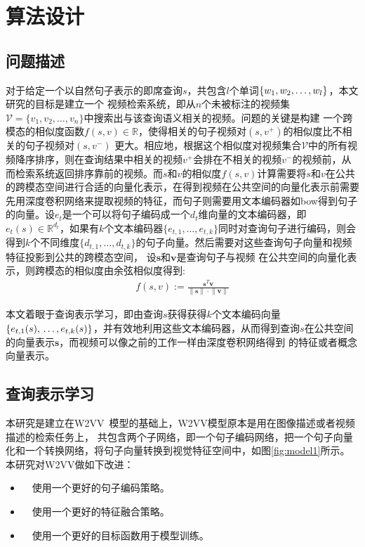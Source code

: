 \chapter{算法设计}

\section{问题描述}
对于给定一个以自然句子表示的即席查询$s$，共包含$l$个单词$\{w_1,w_2,\ldots,\\w_l\}$，本文研究的目标是建立一个
视频检索系统，即从$n$个未被标注的视频集$\mathcal{V}=\{v_1,v_2,\ldots,v_n\}$中搜索出与该查询语义相关的视频。问题的关键是构建
一个跨模态的相似度函数$f(s,v) \in \mathbb{R}$，使得相关的句子视频对$(s,v^+)$的相似度比不相关的句子视频对$(s,v^-)$
更大。相应地，根据这个相似度对视频集合$\mathcal{V}$中的所有视频降序排序，则在查询结果中相关的视频$v^+$会排在不相关的视频$v^-$的视频前，从而检索系统返回排序靠前的视频。而$s$和$v$的相似度$f(s,v)$计算需要将$s$和$v$在公共的跨模态空间进行合适的向量化表示，在得到视频在公共空间的向量化表示前需要先用深度卷积网络来提取视频的特征，而句子则需要用文本编码器如bow得到句子的向量。设$e_t$是一个可以将句子编码成一个$d_t$维向量的文本编码器，即$e_t(s) \in \mathbb{R}^{d_t}$，如果有$k$个文本编码器$\{e_{t,1},\ldots,e_{t,k}\}$同时对查询句子进行编码，则会得到$k$个不同维度$\{d_{t,1},\ldots,d_{t,k}\}$的句子向量。然后需要对这些查询句子向量和视频特征投影到公共的跨模态空间，
设$\mathbf{s}$和$\mathbf{v}$是查询句子与视频
在公共空间的向量化表示，则跨模态的相似度由余弦相似度得到:
\begin{equation}
    \label{eq:cosine-sim}
    \begin{aligned}
        f(s,v) := \frac{\mathbf{s}^T\mathbf{v}}{\left\| \mathbf{s} \right\| \cdot \left\| \mathbf{v} \right\|}
    \end{aligned}
\end{equation}

本文着眼于查询表示学习，即由查询$s$获得获得$k$个文本编码向量$\{e_{t,1}(s),\\ \ldots,e_{t,k}(s)\}$，并有效地利用这些文本编码器，从而得到查询$s$在公共空间的向量表示$\mathbf{s}$，而视频可以像之前的工作一样由深度卷积网络得到
的特征或者概念向量表示。

\section{查询表示学习}
本研究是建立在W2VV~\cite{dong2018predicting}模型的基础上，W2VV模型原本是用在图像描述或者视频描述的检索任务上，
共包含两个子网络，即一个句子编码网络，把一个句子向量化和一个转换网络，将句子向量转换到视觉特征空间中，如图\ref{fig:model1}所示。本研究对W2VV做如下改进：
\begin{itemize}
    \item　使用一个更好的句子编码策略。

    \item　使用一个更好的特征融合策略。

    \item　使用一个更好的目标函数用于模型训练。
\end{itemize}


